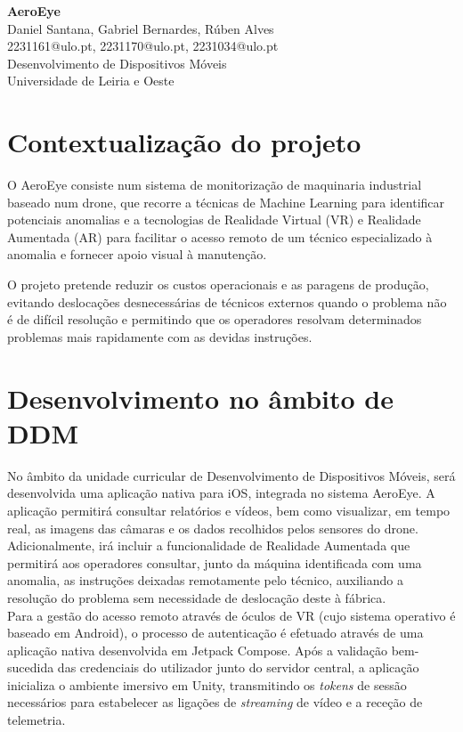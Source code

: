 \documentclass[a4paper,12pt]{article}
\begin{document}
\thispagestyle{empty}

\begin{center}
    {\large\bfseries AeroEye}\\[0.15cm]
    {\small
        Daniel Santana, Gabriel Bernardes, Rúben Alves \\
        2231161@ulo.pt, 2231170@ulo.pt, 2231034@ulo.pt \\
        Desenvolvimento de Dispositivos Móveis\\
        Universidade de Leiria e Oeste
    }
\end{center}

\vspace{-0.3cm}

\section{Contextualização do projeto}

O AeroEye consiste num sistema de monitorização de maquinaria industrial baseado num drone, que recorre a técnicas de Machine Learning para identificar potenciais anomalias e a tecnologias de Realidade Virtual (VR) e Realidade Aumentada (AR) para facilitar o acesso remoto de um técnico especializado à anomalia e fornecer apoio visual à manutenção. 

O projeto pretende reduzir os custos operacionais e as paragens de produção, evitando deslocações desnecessárias de técnicos externos quando o problema não é de difícil resolução e permitindo que os operadores resolvam determinados problemas mais rapidamente com as devidas instruções.

\section{Desenvolvimento no âmbito de DDM}
No âmbito da unidade curricular de Desenvolvimento de Dispositivos Móveis, será desenvolvida uma aplicação nativa para iOS, integrada no sistema AeroEye. A aplicação permitirá consultar relatórios e vídeos, bem como visualizar, em tempo real, as imagens das câmaras e os dados recolhidos pelos sensores do drone. Adicionalmente, irá incluir a funcionalidade de Realidade Aumentada que permitirá aos operadores consultar, junto da máquina identificada com uma anomalia, as instruções deixadas remotamente pelo técnico, auxiliando a resolução do problema sem necessidade de deslocação deste à fábrica. \\
Para a gestão do acesso remoto através de óculos de VR (cujo sistema operativo é baseado em Android), o processo de autenticação é efetuado através de uma aplicação nativa desenvolvida em Jetpack Compose. Após a validação bem-sucedida das credenciais do utilizador junto do servidor central, a aplicação inicializa o ambiente imersivo em Unity, transmitindo os \textit{tokens} de sessão necessários para estabelecer as ligações de \textit{streaming} de vídeo e a receção de telemetria.
\end{document}
